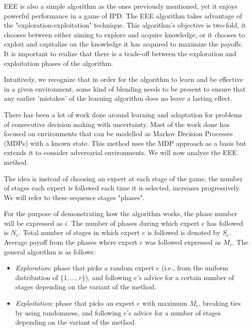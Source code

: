 \documentclass{icldt}
\numberwithin{equation}{section}       %
\begin{document}
EEE is also a simple algorithm as the ones previously mentioned, yet it enjoys powerful performance in a game of IPD. The EEE algorithm takes advantage of the "exploration-exploitation" technique. This algorithm's objective is two-fold, it chooses between either aiming to explore and acquire knowledge, or it chooses to exploit and capitalize on the knowledge it has acquired to maximize the payoffs. It is important to realize that there is a trade-off between the exploration and exploitation phases of the algorithm.

Intuitively, we recognize that in order for the algorithm to learn and be effective in a given environment, some kind of blending needs to be present to ensure that any earlier 'mistakes' of the learning algorithm does no leave a lasting effect.

There has been a lot of work done around learning and adaptation for problems of consecutive decision making with uncertainty. Most of the work done has focused on environments that can be modelled as Markov Decision Processes (MDPs) with a known state. This method uses the MDP approach as a basis but extends it to consider adversarial environments. We will now analyse the EEE method.

The idea is instead of choosing an expert at each stage of the game, the number of stages each expert is followed each time it is selected, increases progressively. We will refer to these sequence stages "phases". 

For the purpose of demonstrating how the algorithm works, the phase number will be expressed as \(i\). The number of phases during which expert \(e\) has followed is \(N_e\). Total number of stages in which expert \(e\) is followed is denoted by \(S_e\). Average payoff from the phases where expert \(e\) was followed expressed as \(M_e\). The general algorithm is as follows:
\begin{itemize}
\item \emph{Exploration}: phase that picks a random expert \(e\) (i.e., from the uniform distribution of \(\{1, . . . , r \}\)), and following \(e\)'s advice for a certain number of stages depending on the variant of the method.
\item \emph{Exploitation}: phase that picks an expert \(e\) with maximum \(M_e\), breaking ties by using randomness, and following \(e\)'s advice for a number of stages depending on the variant of the method.
\end{itemize}
\end{document}
